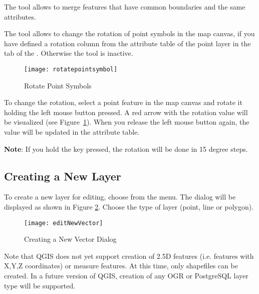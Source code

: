 The  tool allows to
merge features that have common boundaries and the same attributes.  


The  tool 
allows to change the rotation of point symbols in the map canvas, if 
you have defined a rotation column from the attribute table of the point 
layer in the  tab of the . 
Otherwise the tool is inactive.

\begin{figure}[ht]
   \begin{center}
   \caption{Rotate Point Symbols \nixcaption}\label{fig:rotatepoint}\smallskip
   \texttt{[image: rotatepointsymbol]}
\end{center}
\end{figure}

To change the rotation, select a point feature in the map canvas and rotate 
it holding the left mouse button pressed. A red arrow with the rotation value 
will be visualized (see Figure~\ref{fig:rotatepoint}). When you release the 
left mouse button again, the value will be updated in the attribute table. 

\textbf{Note}: If you hold the  key pressed, the rotation will be done 
in 15 degree steps.

\subsection{Creating a New Layer}\label{sec:create shape}

To create a new layer for editing, choose  from the
 menu. 
The  dialog will be displayed as
shown in Figure \ref{fig:newvectorlayer}. Choose the type of layer (point,
line or polygon).

\begin{figure}[ht]
   \begin{center}
   \caption{Creating a New Vector Dialog \nixcaption}\label{fig:newvectorlayer}\smallskip
   \texttt{[image: editNewVector]}
\end{center} 
\end{figure}

Note that QGIS does not yet support creation of 2.5D
features (i.e. features with X,Y,Z coordinates) or measure features. At this
time, only shapefiles can be created. In a future version of QGIS, creation of
any OGR or PostgreSQL layer type will be supported. 

